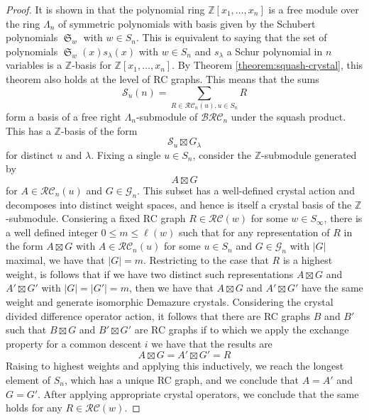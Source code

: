\documentclass{amsart}
\theoremstyle{definition}
\theoremstyle{remark}
\numberwithin{equation}{section}
\DeclareMathOperator{\sch}{\mathfrak{S}}
\newcommand{\BRC}{\mathcal{BRC}}
\newcommand{\RC}{\mathcal{RC}}
\newcommand{\grass}{\mathcal{G}}
\begin{document}
\begin{proof}
It is shown in \cite{notes} that the polynomial ring $\mathbb{Z}[x_1,\ldots,x_n]$ is a free module over the ring $\Lambda_n$ of symmetric polynomials with basis given by the Schubert polynomials $\sch_w$ with $w\in S_n$.  This is equivalent to saying that the set of polynomials $\sch_w(x)s_\lambda(x)$ with $w\in S_n$ and $s_\lambda$ a Schur polynomial in $n$ variables is a $\mathbb{Z}$-basis for $\mathbb{Z}[x_1,\ldots,x_n]$.  By Theorem \ref{theorem:squash-crystal}, this theorem also holds at the level of RC graphs. This means that the sums
$$\mathcal{S}_u(n)=\sum_{R\in\RC_n(u),u\in S_n} R$$
form a basis of a free right $\Lambda_n$-submodule of $\BRC_n$ under the squash product. This has a $\mathbb{Z}$-basis of the form
$$\mathcal{S}_u\boxtimes G_\lambda$$
for distinct $u$ and $\lambda$. Fixing a single $u\in S_n$, consider the $\mathbb{Z}$-submodule generated by
$$A\boxtimes G$$
for $A\in \RC_n(u)$ and $G\in \grass_n$. This subset has a well-defined crystal action and decomposes into distinct weight spaces, and hence is itself a crystal basis of the $\mathbb{Z}$-submodule. Consiering a fixed RC graph $R\in \RC(w)$ for some $w\in S_\infty$, there is a well defined integer $0\leq m\leq \ell(w)$ such that for any representation of $R$ in the form $A\boxtimes G$ with $A\in \RC_n(u)$ for some $u\in S_n$ and $G\in \grass_n$ with $|G|$ maximal, we have that $|G|=m$. Restricting to the case that $R$ is a highest weight, is follows that if we have two distinct such representations $A\boxtimes G$ and $A'\boxtimes G'$ with $|G|=|G'|=m$, then we have that $A\boxtimes G$ and $A'\boxtimes G'$ have the same weight and generate isomorphic Demazure crystals. Considering the crystal divided difference operator action, it follows that there are RC graphs $B$ and $B'$ such that $B\boxtimes G$ and $B'\boxtimes G'$ are RC graphs if to which we apply the exchange property for a common descent $i$ we have that the results are 
$$A\boxtimes G = A'\boxtimes G'=R$$
Raising to highest weights and applying this inductively, we reach the longest element of $S_n$, which has a unique RC graph, and we conclude that $A=A'$ and $G=G'$. After applying appropriate crystal operators, we conclude that the same holds for any $R\in \RC(w)$.
\end{proof}
\end{document}
